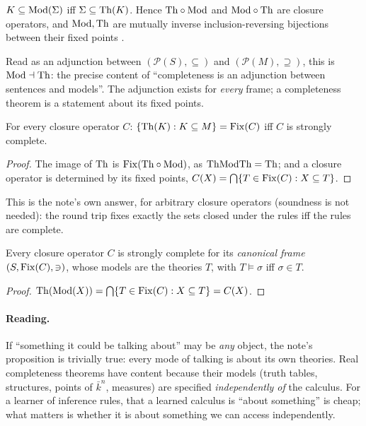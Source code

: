 \begin{lemma}\label{lem:existence:galois}
$K\subseteq\mathrm{Mod}(\Sigma)$ iff $\Sigma\subseteq\mathrm{Th}(K)$. Hence $\mathrm{Th}\circ\mathrm{Mod}$ and $\mathrm{Mod}\circ\mathrm{Th}$ are closure operators, and $\mathrm{Mod},\mathrm{Th}$ are mutually inverse inclusion-reversing bijections between their fixed points \citep{birkhoff1940lattice,ore1944galois}.
\end{lemma}

Read as an adjunction between $(\mathcal P(S),\subseteq)$ and $(\mathcal P(M),\supseteq)$, this is $\mathrm{Mod}\dashv\mathrm{Th}$: the precise content of ``completeness is an adjunction between sentences and models''. The adjunction exists for \emph{every} frame; a completeness theorem is a statement about its fixed points.

\begin{proposition}\label{prop:existence:image}
For every closure operator $C$: $\{\mathrm{Th}(K):K\subseteq M\}=\mathrm{Fix}(C)$ iff $C$ is strongly complete.
\end{proposition}

\begin{proof}
The image of $\mathrm{Th}$ is $\mathrm{Fix}(\mathrm{Th}\circ\mathrm{Mod})$, as $\mathrm{Th}\mathrm{Mod}\mathrm{Th}=\mathrm{Th}$; and a closure operator is determined by its fixed points, $C(X)=\bigcap\{T\in\mathrm{Fix}(C):X\subseteq T\}$.
\end{proof}

This is the note's own answer, for arbitrary closure operators (soundness is not needed): the round trip fixes exactly the sets closed under the rules iff the rules are complete.

\begin{theorem}\label{thm:existence:tautological}
Every closure operator $C$ is strongly complete for its \emph{canonical frame} $(S,\mathrm{Fix}(C),\ni)$, whose models are the theories $T$, with $T\models\sigma$ iff $\sigma\in T$.
\end{theorem}

\begin{proof}
$\mathrm{Th}(\mathrm{Mod}(X))=\bigcap\{T\in\mathrm{Fix}(C):X\subseteq T\}=C(X)$.
\end{proof}

\paragraph{Reading.} If ``something it could be talking about'' may be \emph{any} object, the note's proposition is trivially true: every mode of talking is about its own theories. Real completeness theorems have content because their models (truth tables, structures, points of $\bar k^n$, measures) are specified \emph{independently of} the calculus. For a learner of inference rules, that a learned calculus is ``about something'' is cheap; what matters is whether it is about something we can access independently.

